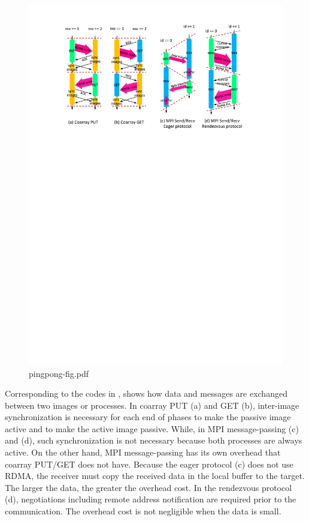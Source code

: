 \begin{figure}[bht]
  \begin{center}
    \mbox{\includegraphics[trim=30mm 195mm 32mm 16mm, scale=0.75,clip]{figs/pingpong-fig-r2.pdf}}
    \caption{pingpong-fig.pdf}\label{fig:pingpong-fig}
  \end{center}
\end{figure}

Corresponding to the codes in ,  shows how data and 
messages are exchanged between two images or processes.
In coarray PUT (a) and GET (b), inter-image synchronization is necessary for each end of 
phases to make the passive image active and to make the active image passive.
While, in MPI message-passing (c) and (d), such synchronization is not necessary because
both processes are always active.
%
On the other hand, MPI message-passing has its own overhead that coarray PUT/GET
does not have. Because the eager protocol (c) does not use RDMA, the receiver
must copy the received data in the local buffer to the target. The larger the data,
the greater the overhead cost.
In the rendezvous protocol (d), negotiations including remote address notification
are required prior to the communication.
The overhead cost is not negligible when the data is small.



